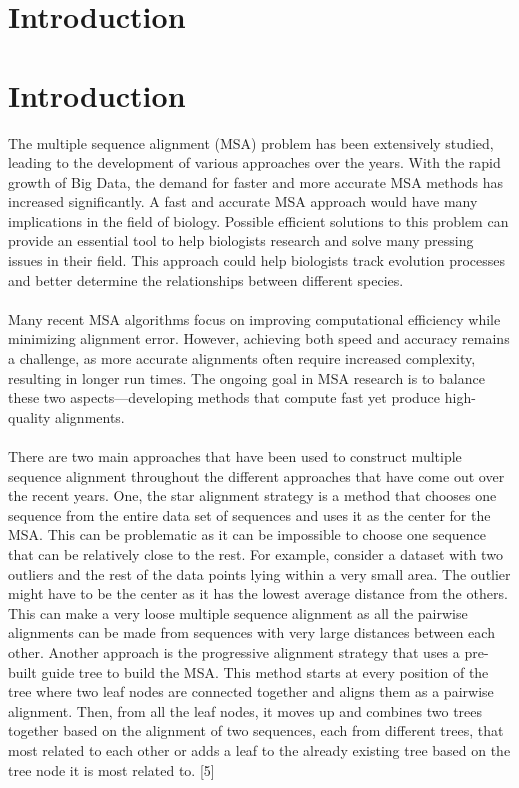 \section{Introduction}
\label{sec:introduction}
\section{Introduction}
\label{sec:introduction}
The multiple sequence alignment (MSA) problem has been extensively studied, leading to the development of various approaches over the years. With the rapid growth of Big Data, the demand for faster and more accurate MSA methods has increased significantly. A fast and accurate MSA approach would have many implications in the field of biology. Possible efficient solutions to this problem can provide an essential tool to help biologists research and solve many pressing issues in their field. This approach could help biologists track evolution processes and better determine the relationships between different species.\\
\\Many recent MSA algorithms focus on improving computational efficiency while minimizing alignment error. However, achieving both speed and accuracy remains a challenge, as more accurate alignments often require increased complexity, resulting in longer run times. The ongoing goal in MSA research is to balance these two aspects—developing methods that compute fast yet produce high-quality alignments. \\
\\There are two main approaches that have been used to construct multiple sequence alignment throughout the different approaches that have come out over the recent years. One, the star alignment strategy is a method that chooses one sequence from the entire data set of sequences and uses it as the center for the MSA. This can be problematic as it can be impossible to choose one sequence that can be relatively close to the rest. For example, consider a dataset with two outliers and the rest of the data points lying within a very small area. The outlier might have to be the center as it has the lowest average distance from the others. This can make a very loose multiple sequence alignment as all the pairwise alignments can be made from sequences with very large distances between each other. Another approach is the progressive alignment strategy that uses a pre-built guide tree to build the MSA. This method starts at every position of the tree where two leaf nodes are connected together and aligns them as a pairwise alignment. Then, from all the leaf nodes, it moves up and combines two trees together based on the alignment of two sequences, each from different trees, that most related to each other or adds a leaf to the already existing tree based on the tree node it is most related to. [5] \\
